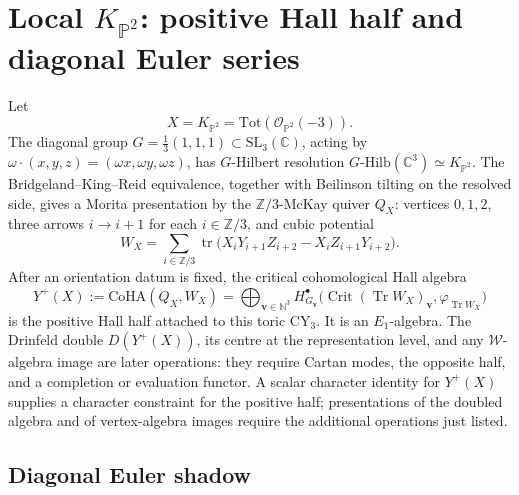 
\providecommand{\P}{\mathbb{P}}
\providecommand{\C}{\mathbb{C}}
\providecommand{\Z}{\mathbb{Z}}
\providecommand{\cH}{\mathcal{H}}
\providecommand{\cM}{\mathcal{M}}
\providecommand{\cO}{\mathcal{O}}
\providecommand{\CoHA}{\mathrm{CoHA}}
\providecommand{\Tot}{\mathrm{Tot}}
\providecommand{\Hilb}{\mathrm{Hilb}}
\providecommand{\PE}{\mathrm{PE}}
\providecommand{\ch}{\mathrm{ch}}
\providecommand{\Yplus}{Y^+}

\section*{Local \texorpdfstring{$K_{\P^2}$}{K-P2}: positive Hall half and diagonal Euler series}
\label{sec:local-p2-yplus-diagonal-character}

Let
\[
 X = K_{\P^2}=\Tot(\cO_{\P^2}(-3)).
\]
The diagonal group \(G=\frac{1}{3}(1,1,1)\subset \mathrm{SL}_3(\C)\),
acting by \(\omega\cdot(x,y,z)=(\omega x,\omega y,\omega z)\), has
\(G\)-Hilbert resolution \(G\text{-}\Hilb(\C^3)\simeq K_{\P^2}\).
The Bridgeland--King--Reid equivalence, together with Beilinson tilting
on the resolved side, gives a Morita presentation by the
\(\Z/3\)-McKay quiver \(Q_X\): vertices \(0,1,2\), three arrows
\(i\to i+1\) for each \(i\in\Z/3\), and cubic potential
\[
 W_X=\sum_{i\in\Z/3}
 \operatorname{tr}\bigl(X_iY_{i+1}Z_{i+2}-X_iZ_{i+1}Y_{i+2}\bigr).
\]
After an orientation datum is fixed, the critical cohomological Hall
algebra
\[
 \Yplus(X)
 :=\CoHA(Q_X,W_X)
 =\bigoplus_{\mathbf v\in\mathbb N^3}
 H^\bullet_{G_{\mathbf v}}
 \bigl(\operatorname{Crit}(\operatorname{Tr}W_X)_{\mathbf v},
 \varphi_{\operatorname{Tr}W_X}\bigr)
\]
is the positive Hall half attached to this toric CY\(_3\). It is an
\(E_1\)-algebra. The Drinfeld double \(D(\Yplus(X))\), its centre at the
representation level, and any \(\mathcal W\)-algebra image are later
operations: they require Cartan modes, the opposite half, and a
completion or evaluation functor. A scalar character identity for
\(\Yplus(X)\) supplies a character constraint for the positive half;
presentations of the doubled algebra and of vertex-algebra images require
the additional operations just listed.

\subsection*{Diagonal Euler shadow}

